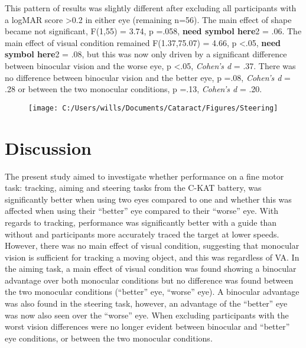\documentclass[
  english,
  man,floatsintext]{apa6}
\begin{document}
This pattern of results was slightly different after excluding all participants with a logMAR score \textgreater{}0.2 in either eye (remaining n=56).
The main effect of shape became not significant, F(1,55) = 3.74, p =.058, \textbf{need symbol here}2 = .06.
The main effect of visual condition remained F(1.37,75.07) = 4.66, p \textless{}.05, \textbf{need symbol here}2 = .08, but this was now only driven by a significant difference between binocular vision and the worse eye, p \textless{}.05, \emph{Cohen's d} = .37.
There was no difference between binocular vision and the better eye, p =.08, \emph{Cohen's d} = .28 or between the two monocular conditions, p =.13, \emph{Cohen's d} = .20.

\begin{figure}

{\centering \texttt{[image: C:/Users/wills/Documents/Cataract/Figures/Steering]} 

}

\caption{ }\label{fig:unnamed-chunk-3}
\end{figure}

\hypertarget{discussion}{%
\section{Discussion}\label{discussion}}

The present study aimed to investigate whether performance on a fine motor task: tracking, aiming and steering tasks from the C-KAT battery, was significantly better when using two eyes compared to one and whether this was affected when using their \enquote{better} eye compared to their \enquote{worse} eye.
With regards to tracking, performance was significantly better with a guide than without and participants more accurately traced the target at lower speeds.
However, there was no main effect of visual condition, suggesting that monocular vision is sufficient for tracking a moving object, and this was regardless of VA.
In the aiming task, a main effect of visual condition was found showing a binocular advantage over both monocular conditions but no difference was found between the two monocular conditions (\enquote{better} eye, \enquote{worse} eye).
A binocular advantage was also found in the steering task, however, an advantage of the \enquote{better} eye was now also seen over the \enquote{worse} eye.
When excluding participants with the worst vision differences were no longer evident between binocular and \enquote{better} eye conditions, or between the two monocular conditions.
\end{document}
